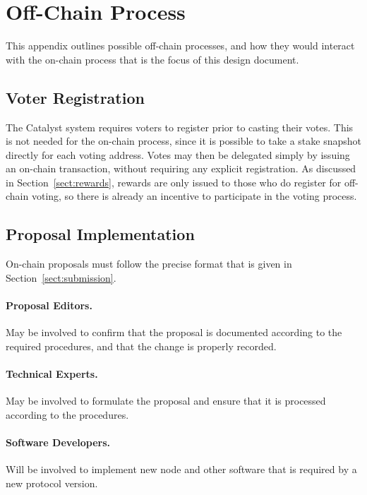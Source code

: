 \section{Off-Chain Process}
\label{sect:off-chain}

This appendix outlines possible off-chain processes, and how they would interact with the on-chain process that is the focus of this design document.

\subsection{Voter Registration}

The Catalyst system requires voters to register prior to casting their votes.  This is not needed for the on-chain process, since it is possible to take a
stake snapshot directly for each voting address. Votes may then be delegated simply by issuing an on-chain transaction, without requiring any explicit registration.
As discussed in Section~\ref{sect:rewards}, rewards are only issued to those who do register for off-chain voting, so there is already an incentive to participate
in the voting process.

\subsection{Proposal Implementation}

On-chain proposals must follow the precise format that is given in Section~\ref{sect:submission}.

\paragraph{Proposal Editors.}  May be involved to confirm that the proposal is documented according to the required procedures, and that the change is properly recorded.

\paragraph{Technical Experts.}  May be involved to formulate the proposal and ensure that it is processed according to the procedures.

\paragraph{Software Developers.} Will be involved to implement new node and other software that is required by a new protocol version.


